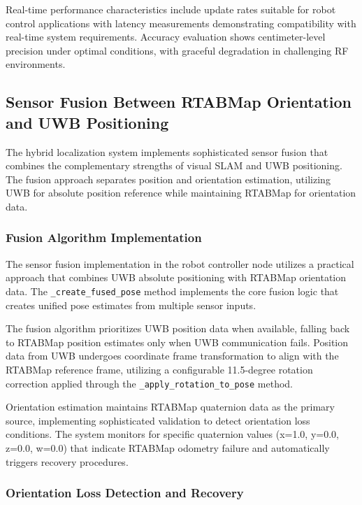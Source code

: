 Real-time performance characteristics include update rates suitable for robot control applications with latency measurements demonstrating compatibility with real-time system requirements. Accuracy evaluation shows centimeter-level precision under optimal conditions, with graceful degradation in challenging RF environments.

\subsection{Sensor Fusion Between RTABMap Orientation and UWB Positioning}

The hybrid localization system implements sophisticated sensor fusion that combines the complementary strengths of visual SLAM and UWB positioning. The fusion approach separates position and orientation estimation, utilizing UWB for absolute position reference while maintaining RTABMap for orientation data.

\subsubsection{Fusion Algorithm Implementation}

The sensor fusion implementation in the robot controller node utilizes a practical approach that combines UWB absolute positioning with RTABMap orientation data. The \texttt{\_create\_fused\_pose} method implements the core fusion logic that creates unified pose estimates from multiple sensor inputs.

The fusion algorithm prioritizes UWB position data when available, falling back to RTABMap position estimates only when UWB communication fails. Position data from UWB undergoes coordinate frame transformation to align with the RTABMap reference frame, utilizing a configurable 11.5-degree rotation correction applied through the \texttt{\_apply\_rotation\_to\_pose} method.

Orientation estimation maintains RTABMap quaternion data as the primary source, implementing sophisticated validation to detect orientation loss conditions. The system monitors for specific quaternion values (x=1.0, y=0.0, z=0.0, w=0.0) that indicate RTABMap odometry failure and automatically triggers recovery procedures.

\subsubsection{Orientation Loss Detection and Recovery}

